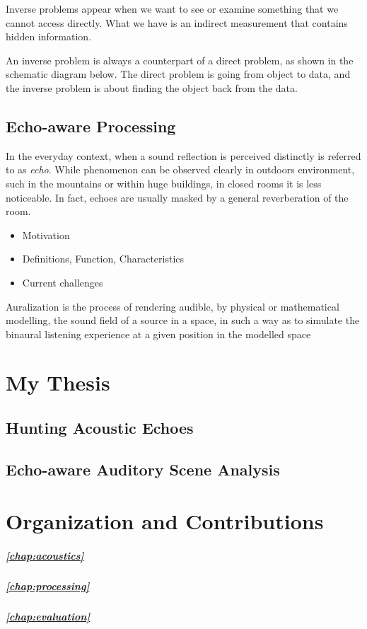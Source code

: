 Inverse problems appear when we want to see or examine something that we cannot access directly. What we have is an indirect measurement that contains hidden information.

An inverse problem is always a counterpart of a direct problem, as shown in the schematic diagram below. The direct problem is going from object to data, and the inverse problem is about finding the object back from the data.

\subsection{Echo-aware Processing}
In the everyday context, when a sound reflection is perceived distinctly is referred to as \textit{echo}.
While phenomenon can be observed clearly in outdoors environment, such in the mountains or within huge buildings,
in closed rooms it is less noticeable. In fact, echoes are usually masked by a general reverberation of the room.

\begin{itemize}
    \item Motivation
    \item Definitions, Function, Characteristics
    \item Current challenges
\end{itemize}

Auralization is the process of rendering audible, by physical or mathematical modelling, the sound field
of a source in a space, in such a way as to simulate the binaural listening experience at a given position in the modelled space

\section{My Thesis}
\subsection{Hunting Acoustic Echoes}
\subsection{Echo-aware Auditory Scene Analysis}


\section{Organization and Contributions}
\subparagraph{\cref{chap:acoustics}}\blindtext
\subparagraph{\cref{chap:processing}}\blindtext
\subparagraph{\cref{chap:evaluation}}\blindtext

